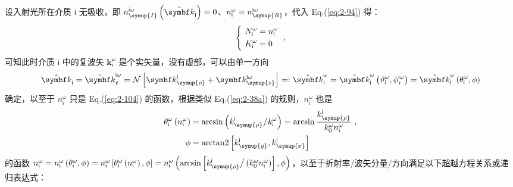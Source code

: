 设入射光所在介质 $\mathsf{i}$ 无吸收，即 $n^{\mathsf{i}\omega}_{\symup{I}} \left( \hat{\symbf k}_{\mathsf{i}} \right) \equiv 0$、$n^{\omega}_{\mathsf{i}} \equiv n^{\mathsf{i}\omega}_{\symup{R}}$，代入 Eq.(\ref{eq:2-94}) 得：
\begin{equation} \label{eq:2-103}
	\abovedisplayskip=12pt
	\belowdisplayskip=12pt
	\left\{\ \begin{aligned} N^{\omega}_{\mathsf{i}} &= n^{\omega}_{\mathsf{i}} \\ K^{\omega}_{\mathsf{i}} &= 0 \end{aligned}\right. ~,
\end{equation}
可知此时介质 $\mathsf{i}$ 中的复波矢 ${\symbf k}^\omega_{\mathsf{i}}$ 是个实矢量，没有虚部，可以由单一方向 
\begin{equation} \label{eq:2-104}
	\abovedisplayskip=12pt
	\belowdisplayskip=12pt
	\hat{\symbf k}_{\mathsf{i}} = \hat{\symbf k}_{\mathfrak{r}}^{\mathsf{i}\omega} = \mathcal{N} \left[ \symbf k^{\mathsf{i}}_{\symup{\rho}} + \symbf k^{\mathsf{i}\omega}_{\symup{z}} \right] =: \hat{\symbf k}^\omega_{\mathsf{i}} = \hat{\symbf k}^\omega_{\mathsf{i}} \left( \vartheta^{\omega}_{\mathsf{i}}, \phi^{\mathsf{i}\omega}_{\mathfrak{r}} \right) = \hat{\symbf k}^\omega_{\mathsf{i}} \left( \theta^{\omega}_{\mathsf{i}}, \phi \right)
\end{equation}
确定，以至于 $n^{\omega}_{\mathsf{i}}$ 只是 Eq.(\ref{eq:2-104}) 的函数，根据类似 Eq.(\ref{eq:2-38a}) 的规则，$n^{\omega}_{\mathsf{i}}$ 也是
\begin{subequations} \label{eq:2-105}
\abovedisplayskip=8pt
\belowdisplayskip=8pt
\begin{align}
	\theta^{\omega}_{\mathsf{i}} \left( n^{\omega}_{\mathsf{i}} \right) &= \arcsin \left( k^{\mathsf{i}}_{\symup{\rho}} \big/ k^{\omega}_{\mathsf{i}} \right) = \arcsin \frac{ k^{\mathsf{i}}_{\symup{\rho}} }{ k^{\omega}_{0} n^{\omega}_{\mathsf{i}} } \label{eq:2-105a}~,\\ \phi &= \text{arctan2} \left[k^{\mathsf{i}}_{\symup{y}}, k^{\mathsf{i}}_{\symup{x}}\right] \label{eq:2-105b}
\end{align}
\end{subequations}
的函数 $n^{\omega}_{\mathsf{i}} = n^{\omega}_{\mathsf{i}} \left( \theta^{\omega}_{\mathsf{i}}, \phi \right) = n^{\omega}_{\mathsf{i}} \left[ \theta^{\omega}_{\mathsf{i}} \left( n^{\omega}_{\mathsf{i}} \right), \phi \right] = n^{\omega}_{\mathsf{i}} \left( \arcsin \left[ k^{\mathsf{i}}_{\symup{\rho}} \big/ \left( k^{\omega}_{0} n^{\omega}_{\mathsf{i}} \right) \right], \phi \right) $，以至于折射率/波矢分量/方向满足以下超越方程关系\cite{grechinFourierSpaceMethod2014,mcleodVectorFourierOptics2014}或递归表达式：
